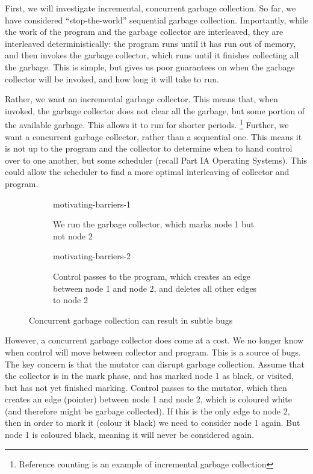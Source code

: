 First, we will investigate incremental, concurrent garbage collection. So far, we have considered ``stop-the-world'' sequential garbage collection. Importantly, while the work of the program and the garbage collector are interleaved, they are interleaved deterministically: the program runs until it has run out of memory, and then invokes the garbage collector, which runs until it finishes collecting all the garbage. This is simple, but gives us poor guarantees on when the garbage collector will be invoked, and how long it will take to run.

Rather, we want an incremental garbage collector. This means that, when invoked, the garbage collector does not clear all the garbage, but some portion of the available garbage. This allows it to run for shorter periods. \footnote{Reference counting is an example of incremental garbage collection} Further, we want a concurrent garbage collector, rather than a sequential one. This means it is not up to the program and the collector to determine when to hand control over to one another, but some scheduler (recall \textsf{Part IA Operating Systems}). This could allow the scheduler to find a more optimal interleaving of collector and program. 

\begin{figure}[H]
    \centering
    \begin{subfigure}{0.45\textwidth}
        \centering
        {motivating-barriers-1}
        \caption{We run the garbage collector, which marks node 1 but not node 2}
    \end{subfigure}
    \begin{subfigure}{0.45\textwidth}
        \centering
        {motivating-barriers-2}
        \caption{Control passes to the program, which creates an edge between node 1 and node 2, and deletes all other edges to node 2}
    \end{subfigure}
    \caption{Concurrent garbage collection can result in subtle bugs}
    \label{fig:motivating-barriers}
\end{figure}

However, a concurrent garbage collector does come at a cost. We no longer know when control will move between collector and program. This is a source of bugs. The key concern is that the mutator can disrupt garbage collection. Assume that the collector is in the mark phase, and has marked node 1 as black, or visited, but has not yet finished marking. Control passes to the mutator, which then creates an edge (pointer) between node 1 and node 2, which is coloured white (and therefore might be garbage collected). If this is the only edge to node 2, then in order to mark it (colour it black) we need to consider node 1 again. But node 1 is coloured black, meaning it will never be considered again. 

